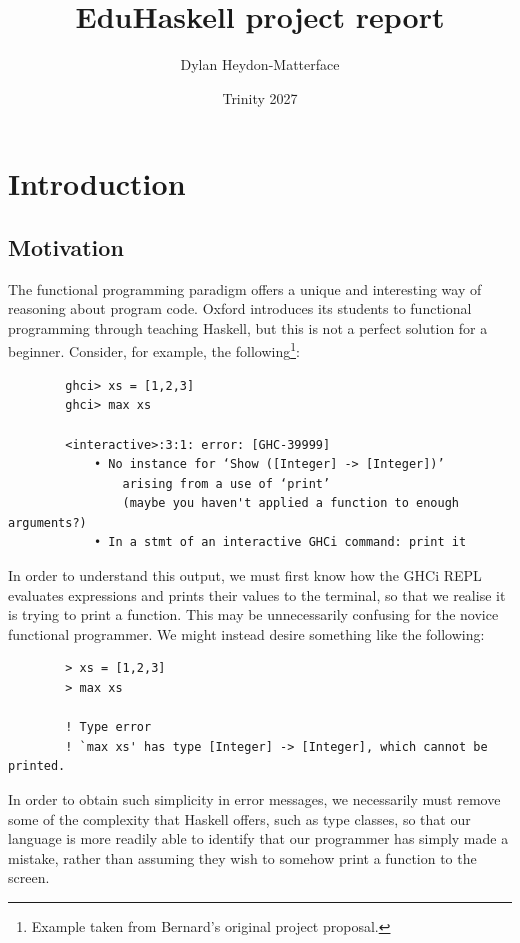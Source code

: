 \documentclass[12pt, a4paper]{report}
\title{EduHaskell project report}
\author{Dylan Heydon-Matterface}
\date{Trinity 2027}
\theoremstyle{definition}
\begin{document}
	\maketitle
	\tableofcontents
	
	\section{Introduction}
	\subsection{Motivation}
	The functional programming paradigm offers a unique and interesting way of reasoning about program code. Oxford introduces its students to functional programming through teaching Haskell, but this is not a perfect solution for a beginner. Consider, for example, the following\footnote{Example taken from Bernard's original project proposal.}:
	
	\begin{verbatim}
		ghci> xs = [1,2,3]
		ghci> max xs
		
		<interactive>:3:1: error: [GHC-39999]
		    • No instance for ‘Show ([Integer] -> [Integer])’
		        arising from a use of ‘print’
		        (maybe you haven't applied a function to enough arguments?)
		    • In a stmt of an interactive GHCi command: print it
	\end{verbatim}
	
	\vspace{-12pt}
	
	In order to understand this output, we must first know how the GHCi REPL evaluates expressions and prints their values to the terminal, so that we realise it is trying to print a function. This may be unnecessarily confusing for the novice functional programmer. We might instead desire something like the following:
	
	\begin{verbatim}
		> xs = [1,2,3]
		> max xs
		
		! Type error
		! `max xs' has type [Integer] -> [Integer], which cannot be printed.
	\end{verbatim}
	
	In order to obtain such simplicity in error messages, we necessarily must remove some of the complexity that Haskell offers, such as type classes, so that our language is more readily able to identify that our programmer has simply made a mistake, rather than assuming they wish to somehow print a function to the screen.
	
\end{document}
